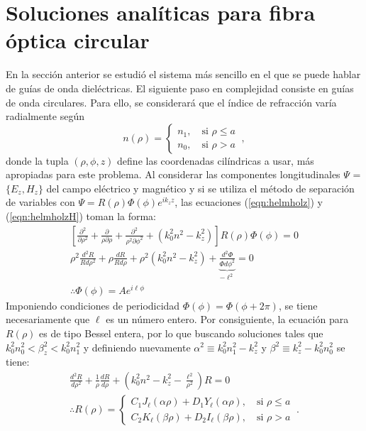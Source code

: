 \section{Soluciones analíticas para fibra óptica circular}
En la sección anterior se estudió el sistema más sencillo en el que se puede hablar de guías de onda dieléctricas. El siguiente paso en complejidad consiste en guías de onda circulares. Para ello, se considerará que el índice de refracción varía radialmente según 
\begin{equation}
	n( \rho ) = 
	\left\{\begin{matrix}
	n_1, \quad \text{si } \rho \le a
	\\
	n_0, \quad \text{si } \rho > a
	\end{matrix}\right.
	\ ,\nonumber
\end{equation}
donde la tupla $(\rho, \phi, z)$ define las coordenadas cilíndricas a usar, más apropiadas para este problema. 
Al considerar las componentes longitudinales $\Psi$ = $\{E_z, H_z\}$ del campo eléctrico y magnético y  si se utiliza el método de separación de variables con $\Psi =  R(\rho)\Phi(\phi) e^{ik_z z} $,  las ecuaciones (\ref{eqn:helmholz}) y (\ref{eqn:helmholzH}) toman la forma:
\begin{align}
	\left[\frac{\partial^2}{\partial \rho^2} + \frac{\partial}{\rho\partial \rho} + \frac{\partial^2}{\rho^2\partial \phi^2} +\left( k_0^2n^2 - k_z^2 \right)\right]  R(\rho)\Phi(\phi) = 0
	\nonumber
	\\
\rho^2\frac{d^2 R}{Rd\rho^2} + \rho\frac{dR}{Rd\rho} + \rho^2\left( k_0^2n^2 - k_z^2 \right) + \underbrace{\frac{d^2 \Phi}{\Phi d\phi^2}}_{-\ell^2} = 0
\nonumber
\\
\therefore \Phi(\phi) = A e^{i\ell\phi}
\nonumber
\end{align}
Imponiendo condiciones de periodicidad $\Phi(\phi)=\Phi(\phi + 2\pi)$, se tiene necesariamente que $\ell$ es un número entero. Por consiguiente, la ecuación para $R(\rho)$ es de tipo Bessel entera, por lo que buscando soluciones tales que $k_0^2 n_0^2 < \beta_z^2 < k_0^2 n_1^2$ y definiendo nuevamente $\alpha^2 \equiv k_0^2n_1^2 - k_z^2$ y $\beta^2\equiv k_z^2 - k_0^2n_0^2$ se tiene:
\begin{align}
	\frac{d^2 R}{d\rho^2} + \frac{1}{\rho}\frac{dR}{d\rho} + \left( k_0^2n^2 - k_z^2 -\frac{\ell^2}{\rho^2}\right)R  = 0
	\nonumber
	\\
	\therefore R(\rho) = 
	\left\{
	\begin{matrix}	
	C_1 J_\ell (\alpha\rho) + D_1 Y_\ell (\alpha\rho), \quad \text{si } \rho \le a  
	\\
	C_2 K_\ell (\beta\rho) + D_2 I_\ell (\beta\rho), \quad \text{si } \rho > a  
	\end{matrix}
	\right.
	\ . \nonumber
\end{align}
